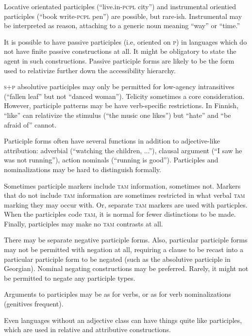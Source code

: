 \documentclass[11pt]{article}
\newcommand{\I}[1]{\textsc{#1}}   %
\begin{document}
{Locative orientated participles (``live.in-\I{pcpl} city'') and
instrumental orientied participles (``book write-\I{pcpl} pen'') are
possible, but rare-ish.  Instrumental may be interpreted as reason,
attaching to a generic noun meaning ``way'' or ``time.''

It is possible to have passive participles (i.e, oriented on \I{p}) in
languages which do not have finite passive constructions at all.  It
might be obligatory to state the agent in such constructions.  Passive
participle forms are likely to be the form used to relativize further
down the accessibility hierarchy.

\I{s+p} absolutive participles may only be permitted for low-agency
intransitives (``fallen leaf'' but not ``danced woman'').  Telicity
sometimes a core consideration.  However, participle patterns may be
have verb-specific restrictions.  In Finnish, ``like'' can relativize
the stimulus (``the music one likes'') but ``hate'' and ``be afraid
of'' cannot.

Participle forms often have several functions in addition to
adjective-like attribution: adverbial (``watching the children,
...''), clausal argument (``I saw he was not running''), action
nominals (``running is good'').  Participles and nominalizations may
be hard to distinguish formally.

Sometimes participle markers include \I{tam} information, sometimes
not.  Markers that do not include \I{tam} information are sometimes
restricted in what verbal \I{tam} marking they may occur with.  Or,
separate \I{tam} markers are used with particples.  When the
participles code \I{tam}, it is normal for fewer distinctions to be
made.  Finally, participles may make no \I{tam} contrasts at all.

There may be separate negative participle forms.  Also, particular
participle forms may not be permitted with negation at all, requiring
a clause to be recast into a particular participle form to be negated
(such as the absolutive participle in Georgian).  Nominal negating
constructions may be preferred.  Rarely, it might not be permitted to
negate any participle types.

Arguments to participles may be as for verbs, or as for verb
nominalizations (genitives frequent).

Even languages without an adjective class can have things quite like
participles, which are used in relative and attributive constructions. 

}
\end{document}
